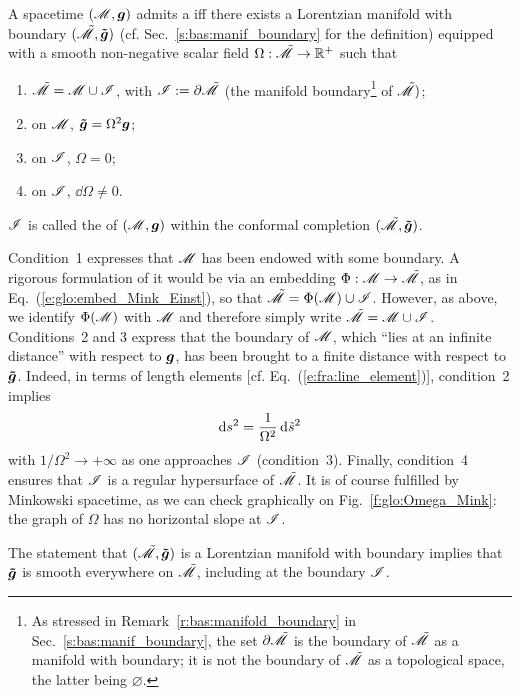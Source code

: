 \begin{greybox}
A spacetime $(\mathscr{M},\bm{g})$ admits a
iff there exists a Lorentzian manifold with boundary
$(\tilde{\mathscr{M}},\bm{\tilde{g}})$ (cf. Sec.~\ref{s:bas:manif_boundary} for the definition)
equipped with a smooth non-negative scalar field
$\Omega: \tilde{\mathscr{M}} \rightarrow \mathbb{R}^+$
such that
\begin{enumerate}
\item $\tilde{\mathscr{M}} = \mathscr{M} \cup \mathscr{I}$, with $\mathscr{I} := \partial \tilde{\mathscr{M}}$
(the manifold boundary\footnote{As stressed in Remark~\ref{r:bas:manifold_boundary}
in Sec.~\ref{s:bas:manif_boundary}, the set $\partial \tilde{\mathscr{M}}$ is
the boundary of $\tilde{\mathscr{M}}$ as a manifold with boundary; it is not the boundary of
$\tilde{\mathscr{M}}$ as a topological space, the latter being $\varnothing$.} of $\tilde{\mathscr{M}})$;
\item on $\mathscr{M}$, $\bm{\tilde{g}} = \Omega^2 \bm{g}$;
\item on $\mathscr{I}$, $\Omega=0$;
\item on $\mathscr{I}$, $\dd \Omega \not= 0$.
\end{enumerate}
$\mathscr{I}$ is called the 
of $(\mathscr{M},\bm{g})$ within
the conformal completion $(\tilde{\mathscr{M}},\bm{\tilde{g}})$.
\end{greybox}
Condition~1 expresses that $\mathscr{M}$ has been endowed with some boundary.
A rigorous formulation of it would be via an embedding $\Phi:\mathscr{M} \rightarrow \tilde{\mathscr{M}}$,
as in Eq.~(\ref{e:glo:embed_Mink_Einst}), so that
$\tilde{\mathscr{M}} = \Phi(\mathscr{M}) \cup \mathscr{I}$. However, as above, we identify $\Phi(\mathscr{M})$
with $\mathscr{M}$ and therefore simply write $\tilde{\mathscr{M}} = \mathscr{M} \cup \mathscr{I}$.
Conditions~2 and 3 express that the boundary of $\mathscr{M}$, which ``lies at an infinite
distance'' with respect to $\bm{g}$, has been brought to a
finite distance with respect to $\bm{\tilde{g}}$. Indeed, in terms of
length elements [cf. Eq.~(\ref{e:fra:line_element})], condition~2 implies
\[
    \mathrm{d} s^2 = \frac{1}{\Omega^2} \, \mathrm{d} {\tilde s}^2
\]
with $1/\Omega^2 \rightarrow +\infty$ as one approaches $\mathscr{I}$
(condition~3).
Finally, condition~4 ensures
that $\mathscr{I}$ is a regular hypersurface of $\tilde{\mathscr{M}}$.
It is of course fulfilled by Minkowski spacetime, as we can check graphically
on Fig.~\ref{f:glo:Omega_Mink}: the graph of $\Omega$ has no horizontal slope
at $\mathscr{I}$.

\begin{remark}
The statement that $(\tilde{\mathscr{M}},\bm{\tilde{g}})$ is a Lorentzian manifold with
boundary implies that $\bm{\tilde{g}}$ is smooth everywhere on $\tilde{\mathscr{M}}$,
including at the boundary $\mathscr{I}$.
\end{remark}

